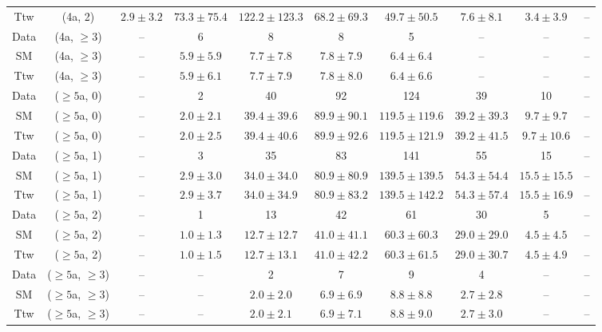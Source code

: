 \begin{table}[h!]
{\begin{tabular}{cccccccccc}
	Ttw & (4a, 2) & $2.9\pm 3.2$ & $73.3\pm 75.4$ & $122.2\pm 123.3$ & $68.2\pm 69.3$ & $49.7\pm 50.5$ & $7.6\pm 8.1$ & $3.4\pm 3.9$ & -- \\[0.5ex] 
	Data & (4a, $\ge3$) & -- & 6 & 8 & 8 & 5 & -- & -- & -- \\[0.5ex] 
	SM & (4a, $\ge3$) & -- & $5.9\pm 5.9$ & $7.7\pm 7.8$ & $7.8\pm 7.9$ & $6.4\pm 6.4$ & -- & -- & -- \\[0.5ex] 
	Ttw & (4a, $\ge3$) & -- & $5.9\pm 6.1$ & $7.7\pm 7.9$ & $7.8\pm 8.0$ & $6.4\pm 6.6$ & -- & -- & -- \\[0.5ex] 
	Data & ($\ge5$a, 0) & -- & 2 & 40 & 92 & 124 & 39 & 10 & -- \\[0.5ex] 
	SM & ($\ge5$a, 0) & -- & $2.0\pm 2.1$ & $39.4\pm 39.6$ & $89.9\pm 90.1$ & $119.5\pm 119.6$ & $39.2\pm 39.3$ & $9.7\pm 9.7$ & -- \\[0.5ex] 
	Ttw & ($\ge5$a, 0) & -- & $2.0\pm 2.5$ & $39.4\pm 40.6$ & $89.9\pm 92.6$ & $119.5\pm 121.9$ & $39.2\pm 41.5$ & $9.7\pm 10.6$ & -- \\[0.5ex] 
	Data & ($\ge5$a, 1) & -- & 3 & 35 & 83 & 141 & 55 & 15 & -- \\[0.5ex] 
	SM & ($\ge5$a, 1) & -- & $2.9\pm 3.0$ & $34.0\pm 34.0$ & $80.9\pm 80.9$ & $139.5\pm 139.5$ & $54.3\pm 54.4$ & $15.5\pm 15.5$ & -- \\[0.5ex] 
	Ttw & ($\ge5$a, 1) & -- & $2.9\pm 3.7$ & $34.0\pm 34.9$ & $80.9\pm 83.2$ & $139.5\pm 142.2$ & $54.3\pm 57.4$ & $15.5\pm 16.9$ & -- \\[0.5ex] 
	Data & ($\ge5$a, 2) & -- & 1 & 13 & 42 & 61 & 30 & 5 & -- \\[0.5ex] 
	SM & ($\ge5$a, 2) & -- & $1.0\pm 1.3$ & $12.7\pm 12.7$ & $41.0\pm 41.1$ & $60.3\pm 60.3$ & $29.0\pm 29.0$ & $4.5\pm 4.5$ & -- \\[0.5ex] 
	Ttw & ($\ge5$a, 2) & -- & $1.0\pm 1.5$ & $12.7\pm 13.1$ & $41.0\pm 42.2$ & $60.3\pm 61.5$ & $29.0\pm 30.7$ & $4.5\pm 4.9$ & -- \\[0.5ex] 
	Data & ($\ge5$a, $\ge3$) & -- & -- & 2 & 7 & 9 & 4 & -- & -- \\[0.5ex] 
	SM & ($\ge5$a, $\ge3$) & -- & -- & $2.0\pm 2.0$ & $6.9\pm 6.9$ & $8.8\pm 8.8$ & $2.7\pm 2.8$ & -- & -- \\[0.5ex] 
	Ttw & ($\ge5$a, $\ge3$) & -- & -- & $2.0\pm 2.1$ & $6.9\pm 7.1$ & $8.8\pm 9.0$ & $2.7\pm 3.0$ & -- & -- \\[0.5ex] 
	\hline
	\hline
\end{tabular}}
\end{table}
